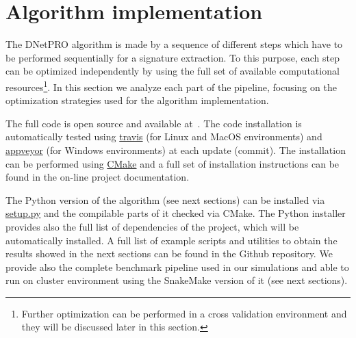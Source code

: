 \documentclass{standalone}
\begin{document}
\section[DNetPRO Implementation]{Algorithm implementation}\label{implementation:implementation}

The \textsf{DNetPRO} algorithm is made by a sequence of different steps which have to be performed sequentially for a signature extraction.
To this purpose, each step can be optimized independently by using the full set of available computational resources\footnote{
  Further optimization can be performed in a cross validation environment and they will be discussed later in this section.
}.
In this section we analyze each part of the pipeline, focusing on the optimization strategies used for the algorithm implementation.

The full code is open source and available at~\cite{DNetPRO}.
The code installation is automatically tested using \href{https://github.com/Nico-Curti/DNetPRO/blob/master/.travis.yml
}{\textsf{travis}} (for Linux and MacOS environments) and \href{https://github.com/Nico-Curti/DNetPRO/blob/master/appveyor.yml}{\textsf{appveyor}} (for Windows environments) at each update (commit).
The installation can be performed using \href{https://github.com/Nico-Curti/DNetPRO/blob/master/CMakeLists.txt}{\textsf{CMake}} and a full set of installation instructions can be found in the on-line project documentation.

The \textsf{Python} version of the algorithm (see next sections) can be installed via \href{https://github.com/Nico-Curti/DNetPRO/blob/master/setup.py}{\textsf{setup.py}} and the compilable parts of it checked via \textsf{CMake}.
The \textsf{Python} installer provides also the full list of dependencies of the project, which will be automatically installed.
A full list of example scripts and utilities to obtain the results showed in the next sections can be found in the Github repository.
We provide also the complete benchmark pipeline used in our simulations and able to run on cluster environment using the \textsf{SnakeMake} version of it (see next sections).
\end{document}
